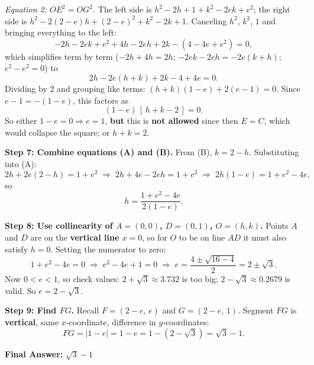 \begin{ReasoningBox}[title={Case Study: Math Reasoning (Smaller \& Larger Setting)}, breakable]
\textit{Equation 2: $OE^2 = OG^2$.} The left side is $h^2 - 2h + 1 + k^2 - 2ek + e^2$; the right side is $h^2 - 2(2-e)h + (2-e)^2 + k^2 - 2k + 1$. Canceling $h^2$, $k^2$, $1$ and bringing everything to the left:
\[
-2h - 2ek + e^2 + 4h - 2eh + 2k - (4 - 4e + e^2) = 0,
\]
which simplifies term by term ($-2h + 4h = 2h$; $-2ek - 2eh = -2e(k+h)$; $e^2 - e^2 = 0$) to
\[
2h - 2e(h + k) + 2k - 4 + 4e = 0.
\]
Dividing by 2 and grouping like terms: $(h + k)(1 - e) + 2(e - 1) = 0$. Since $e - 1 = -(1-e)$, this factors as
\[
(1 - e)\,[\,h + k - 2\,] = 0.
\]
So either $1 - e = 0 \Rightarrow e = 1$, \textbf{but} this is \textbf{not allowed} since then $E = C$, which would collapse the square; or $h + k = 2$. \quad {}

\textbf{Step 7: Combine equations (A) and (B).} From (B), $k = 2 - h$. Substituting into (A):
\[
2h + 2e(2 - h) = 1 + e^2 \;\Longrightarrow\; 2h + 4e - 2eh = 1 + e^2 \;\Longrightarrow\; 2h(1 - e) = 1 + e^2 - 4e,
\]
so
\[
h = \frac{1 + e^2 - 4e}{2(1 - e)}.
\]

\textbf{Step 8: Use collinearity of $A = (0,0)$, $D = (0,1)$, $O = (h,k)$.} Points $A$ and $D$ are on the \textbf{vertical line $x = 0$}, so for $O$ to be on line $AD$ it must also satisfy $h = 0$. Setting the numerator to zero:
\[
1 + e^2 - 4e = 0 \;\Longrightarrow\; e^2 - 4e + 1 = 0 \;\Longrightarrow\; e = \frac{4 \pm \sqrt{16 - 4}}{2} = 2 \pm \sqrt{3}.
\]
Now $0 < e < 1$, so check values: $2 + \sqrt{3} \approx 3.732$ is too big; $2 - \sqrt{3} \approx 0.2679$ is valid. So $e = 2 - \sqrt{3}$.

\textbf{Step 9: Find $FG$.} Recall $F = (2-e,\, e)$ and $G = (2-e,\, 1)$. Segment $FG$ is \textbf{vertical}, same $x$-coordinate, difference in $y$-coordinates:
\[
FG = |1 - e| = 1 - e = 1 - (2 - \sqrt{3}) = \sqrt{3} - 1.
\]

 \textbf{Final Answer:} $\boxed{\sqrt{3} - 1}$
\end{ReasoningBox}
\label{fig:example_math_scale}

\bigskip


